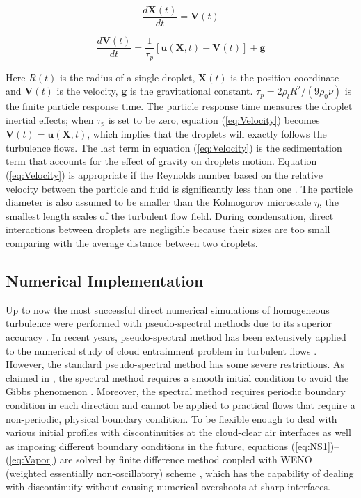\documentclass[12pt]{article}
\begin{document}
\begin{equation}
\frac{d\mathbf{X}(t)}{dt}=\mathbf{V}(t)\label{eq:Coords}
\end{equation}


\begin{equation}
\frac{d\mathbf{V}(t)}{dt}=\frac{1}{\tau_{p}}[\mathbf{u}(\mathbf{X},t)-\mathbf{V}(t)]+\mathbf{g}\label{eq:Velocity}
\end{equation}


Here $R(t)$ is the radius of a single droplet, $\mathbf{X}(t)$ is the position
coordinate and $\mathbf{V}(t)$ is the velocity, $\mathbf{g}$ is the gravitational constant. $\tau_{p}=2\rho_{l}R^{2}/(9\rho_{0}\nu)$ is the finite
particle response time. The particle response time measures the droplet
inertial effects; when $\tau_{p}$ is set to be zero, equation (\ref{eq:Velocity}) becomes $\mathbf{V}(t)=\mathbf{u}(\mathbf{X},t)$, which implies that the droplets will exactly follows the turbulence flows. The last term in equation (\ref{eq:Velocity}) is the sedimentation term that accounts for the effect of gravity on droplets motion. Equation (\ref{eq:Velocity}) is appropriate if the Reynolds number based on the relative velocity between the particle and fluid is significantly less than one \cite{Eaton94}. The particle
diameter is also assumed to be smaller than the Kolmogorov microscale
$\eta$, the smallest length scales of the turbulent flow field. During
condensation, direct interactions between droplets are negligible because
their sizes are too small comparing with the average distance between
two droplets.

\subsection{Numerical Implementation}
Up to now the most successful direct numerical simulations of homogeneous 
turbulence were performed with pseudo-spectral methods due to its 
superior accuracy \cite{Rogallo81,Orszag72}. In recent years, pseudo-spectral 
method has been extensively applied to the numerical study of cloud 
entrainment problem in turbulent flows \cite{And04,Celani05,Kumar11}. However, the standard pseudo-spectral method has some severe restrictions. 
As claimed in \cite{Kumar11}, the spectral method requires a smooth initial condition to avoid the Gibbs phenomenon \cite{Hussaini87}. Moreover, the spectral method requires periodic boundary condition in each direction and cannot be applied to practical flows that require a non-periodic, physical boundary condition. To be flexible enough to deal with various initial profiles with discontinuities at the cloud-clear air interfaces as well as imposing different boundary conditions in the future, equations (\ref{eq:NS1})--(\ref{eq:Vapor}) are solved by finite difference method coupled with WENO (weighted essentially non-oscillatory) scheme \cite{WENO96}, which has the capability of dealing with discontinuity without causing numerical overshoots at sharp interfaces.
\end{document}
